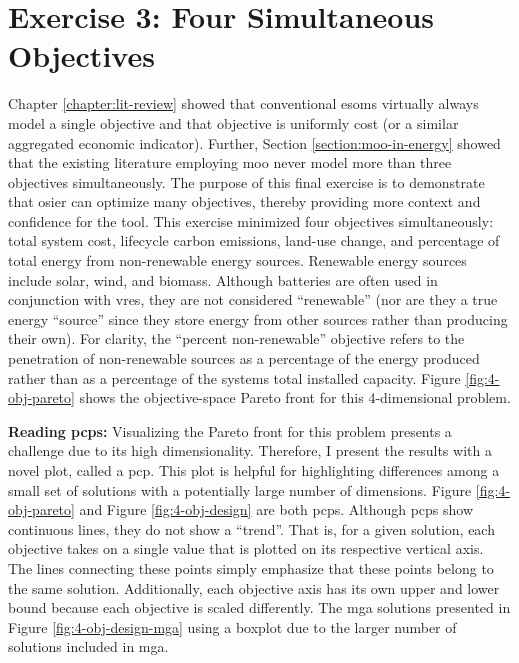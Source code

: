 
\section{Exercise 3: Four Simultaneous Objectives}
Chapter \ref{chapter:lit-review} showed that conventional \acp{esom} virtually
always model a single objective and that objective is uniformly cost (or a
similar aggregated economic indicator). Further, Section
\ref{section:moo-in-energy} showed that the existing literature employing
\ac{moo} never model more than three objectives simultaneously. The purpose of
this final exercise is to demonstrate that \ac{osier} can optimize many
objectives, thereby providing more context and confidence for the tool. This
exercise minimized four objectives simultaneously: total system cost, lifecycle
carbon emissions, land-use change, and percentage of total energy from
non-renewable energy sources. Renewable energy sources include solar, wind, and
biomass. Although batteries are often used in conjunction with \acp{vre}, they
are not considered ``renewable'' (nor are they a true energy ``source'' since
they store energy from other sources rather than producing their own). For
clarity, the ``percent non-renewable'' objective refers to the penetration of
non-renewable sources as a percentage of the energy produced rather than as a
percentage of the systems total installed capacity. Figure
\ref{fig:4-obj-pareto} shows the objective-space Pareto front for this
4-dimensional problem.

\begin{noteBox}
\textbf{Reading \Aclp{pcp}:} Visualizing the Pareto front for this problem
presents a challenge due to its high dimensionality. Therefore, I present the
results with a novel plot, called a \ac{pcp}. This plot is helpful for
highlighting differences among a small set of solutions with a potentially large
number of dimensions. Figure \ref{fig:4-obj-pareto} and Figure
\ref{fig:4-obj-design} are both \acp{pcp}. Although \acp{pcp} show continuous
lines, they do not show a ``trend''. That is, for a given solution, each
objective takes on a single value that is plotted on its respective vertical
axis. The lines connecting these points simply emphasize that these points
belong to the same solution. Additionally, each objective axis has its own upper
and lower bound because each objective is scaled differently. The \ac{mga}
solutions presented in Figure \ref{fig:4-obj-design-mga} using a boxplot due to
the larger number of solutions included in \ac{mga}. 
\end{noteBox}


